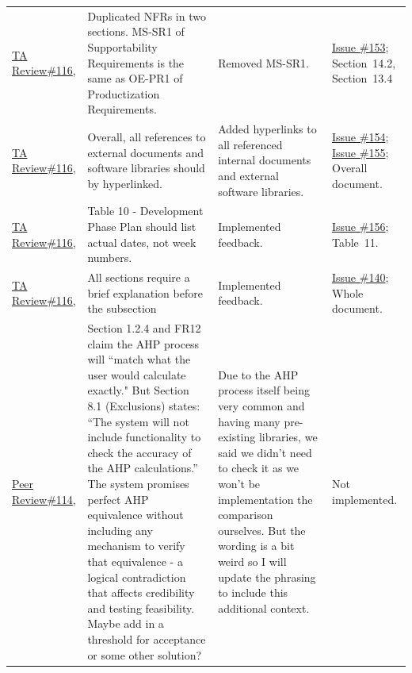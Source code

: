 \documentclass{article}
\begin{document}
\begin{longtable}{p{} p{}
                    p{} p{}}
    \href{https://github.com/thaafei/DomainX/issues/116}{TA Review\#116},
    &
    Duplicated NFRs in two sections. MS-SR1 of Supportability Requirements is the same as OE-PR1 of Productization Requirements.
    &
    Removed MS-SR1.
    &
    \href{https://github.com/thaafei/DomainX/issues/153}{Issue \#153}; Section~14.2, Section~13.4 \\

    \href{https://github.com/thaafei/DomainX/issues/116}{TA Review\#116},
    &
    Overall, all references to external documents and software libraries should by hyperlinked.
    &
    Added hyperlinks to all referenced internal documents and external software libraries.
    &
    \href{https://github.com/thaafei/DomainX/issues/154}{Issue \#154}; \href{https://github.com/thaafei/DomainX/issues/155}{Issue \#155}; Overall document. \\

    \href{https://github.com/thaafei/DomainX/issues/116}{TA Review\#116},
    &
    Table 10 - Development Phase Plan should list actual dates, not week numbers.
    &
    Implemented feedback.
    &
    \href{https://github.com/thaafei/DomainX/issues/156}{Issue \#156}; Table~11. \\

    \href{https://github.com/thaafei/DomainX/issues/116}{TA Review\#116},
    &
    All sections require a brief explanation before the subsection
    &
    Implemented feedback.
    &
    \href{https://github.com/thaafei/DomainX/issues/140}{Issue \#140}; Whole document. \\

    \href{https://github.com/thaafei/DomainX/issues/114}{Peer Review\#114},
    &
    Section 1.2.4 and FR12 claim the AHP process will “match what the user would calculate exactly." But Section 8.1 (Exclusions) states: “The system will not include functionality to check the accuracy of the AHP calculations.” The system promises perfect AHP equivalence without including any mechanism to verify that equivalence - a logical contradiction that affects credibility and testing feasibility. Maybe add in a threshold for acceptance or some other solution?
    &
    Due to the AHP process itself being very common and having many pre-existing libraries, we said we didn't need to check it as we won't be implementation the comparison ourselves. But the wording is a bit weird so I will update the phrasing to include this additional context.
    &
    Not implemented. \\


\end{longtable}
\end{document}
